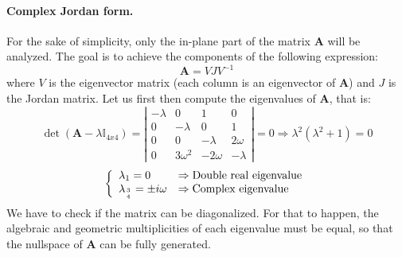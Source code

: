 			\paragraph{ Complex Jordan form. \\}
			\indent For the sake of simplicity, only the in-plane part of the matrix $\bm A$ will be analyzed. The goal is to achieve the components of the following expression:
			\[
			\bm A = V J V^{-1}		
			\]
			\noindent where $V$ is the eigenvector matrix (\ie each column is an eigenvector of $\bm A$) and $J$ is the Jordan matrix. Let us first then compute the eigenvalues of $\bm A$, that is:
			\[
			\det \left(\bm A - \lambda \mathbb{I}_{4x4} \right) = \left\lvert \begin{array}{cccc}
			-\lambda 	& 0			& 1			& 0			\\
			0			& -\lambda 	& 0 		& 1			\\
			0			& 0			& -\lambda	& 2 \omega	\\
			0			& 3\omega^2	& -2\omega	& - \lambda
			\end{array}\right\rvert = 0 \Rightarrow \lambda^2 (\lambda^2 + 1) = 0
			\]
			\begin{equation}
			\left\{ \begin{array}{ll}
			\lambda_{1} = 0 & \Rightarrow \text{Double real eigenvalue} \\
			\lambda_{3\atop 4} = \pm i \omega & \Rightarrow \text{Complex eigenvalue} 
			\end{array}\right.
			\end{equation}
			\indent We have to check if the matrix can be diagonalized. For that to happen, the algebraic and geometric multiplicities of each eigenvalue must be equal, so that the nullspace of $\bm A$ can be fully generated. 
